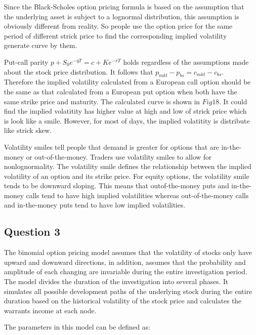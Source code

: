 \documentclass[sigconf]{acmart}
\begin{document}
Since the Black-Scholes option pricing formula is based on the assumption that the underlying asset is subject to a lognormal distribution, this assumption is obviously different from reality. So people use the option price for the same period of different strick price to find the corresponding implied volatility generate curve by them.

Put-call parity $p+S_{0}e^{-qT} = c+Ke^{-rT}$ holds regardless of the assumptions made about the stock price distribution. It follows that $p_{mkt}-p_{bs}=c_{mkt}-c_{bs}$\cite{hull2016options}. Therefore the implied volatility calculated from a European call option should be the same as that calculated from a European put option when both have the same strike price and maturity. The calculated curve is shown in $Fig18$. It could find the implied volatitity has higher value at high and low of strick price which is look like a smile. However, for most of days, the implied volatitity is distribute like strick skew.

Volatility smiles tell people that demand is greater for options that are in-the-money or out-of-the-money. Traders use volatility smiles to allow for nonlognormality. The volatility smile defines the relationship between the implied volatility of an option and its strike price. For equity options, the volatility smile tends to be downward sloping. This means that outof-the-money puts and in-the-money calls tend to have high implied volatilities whereas out-of-the-money calls and in-the-money puts tend to have low implied volatilities\cite{hull2016options}.


\subsection{Question 3}

The binomial option pricing model assumes that the volatility of stocks only have upward and downward directions, in addition, assumes that the probability and amplitude of each changing are invariable during the entire investigation period. The model divides the duration of the investigation into several phases. It simulates all possible development paths of the underlying stock during the entire duration based on the historical volatility of the stock price and calculates the warrants income at each node.

The parameters in this model can be defined as:
\end{document}
